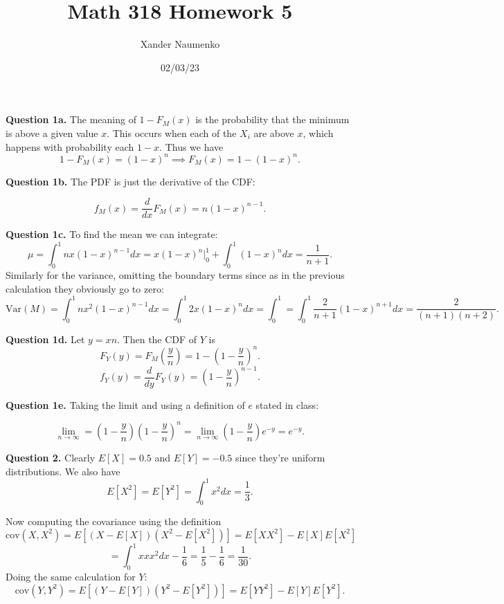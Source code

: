 \documentclass[letterpaper, reqno,11pt]{article}
\begin{document}
\title{Math 318 Homework 5}
\date{02/03/23}
\author{Xander Naumenko}
\maketitle



{\medskip\noindent\bf Question 1a.} The meaning of $1-F_M(x)$ is the probability that the minimum is above a given value $x$. This occurs when each of the $X_i$ are above $x$, which happens with probability each $1-x$. Thus we have 
\[
1-F_M(x)=(1-x)^{n}\implies F_M(x)=1-(1-x)^{n}
.\]

{\medskip\noindent\bf Question 1b.} The PDF is just the derivative of the CDF: 

\[
f_M(x)=\frac{d}{dx}F_M(x)=n(1-x)^{n-1}
.\]

{\medskip\noindent\bf Question 1c.} To find the mean we can integrate: 
\[
    \mu=\int_0^{1}nx(1-x)^{n-1}dx=x(1-x)^{n}\bigg|_0^1+\int_0^{1}(1-x)^{n}dx=\frac{1}{n+1}
.\]
Similarly for the variance, omitting the boundary terms since as in the previous calculation they obviously go to zero: 
\[
    \text{Var}(M)=\int_0^{1}nx^2(1-x)^{n-1}dx=\int_0^{1}2x(1-x)^{n}dx=\int_0^{1}=\int_0^{1}\frac{2}{n+1}(1-x)^{n+1}dx=\frac{2}{(n+1)(n+2)}
.\]

{\medskip\noindent\bf Question 1d.} Let $y=xn$. Then the CDF of $Y$ is 
\[
F_Y(y)=F_M(\frac{y}{n})=1-(1-\frac{y}{n})^{n}
.\]
\[
    f_Y(y)=\frac{d}{dy}F_Y(y)=(1-\frac{y}{n})^{n-1}
.\]

{\medskip\noindent\bf Question 1e.} Taking the limit and using a definition of $e$ stated in class:

\[
\lim_{n\to\infty}=(1-\frac{y}{n})(1-\frac{y}{n})^{n}=\lim_{n\to\infty}(1-\frac{y}{n})e^{-y}=e^{-y}
.\]

{\medskip\noindent\bf Question 2.} Clearly $E[X]=0.5$ and $E[Y]=-0.5$ since they're uniform distributions. We also have
\[
    E[X^2]=E[Y^2]=\int_0^{1}x^2dx=\frac{1}{3}
.\]

Now computing the covariance using the definition
\[
    \text{cov}(X, X^2)=E\left[(X-E[X])(X^2-E[X^2])\right]=E[XX^2]-E[X]E[X^2]%
\]
\[
=\int_0^{1}x x x^2dx-\frac{1}{6}=\frac{1}{5}-\frac{1}{6}=\frac{1}{30}
.\]
Doing the same calculation for $Y$: 
\[
    \text{cov}(Y, Y^2)=E\left[(Y-E[Y])(Y^2-E[Y^2])\right]=E[YY^2]-E[Y]E[Y^2]%
.\]
\end{document}
